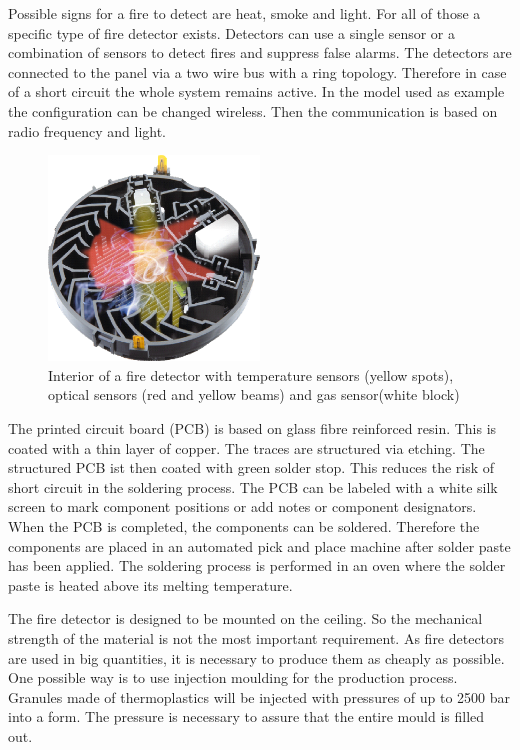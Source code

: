 Possible signs for a fire to detect are heat, smoke and light. For all of 
those a specific type of fire detector exists. Detectors can use a single 
sensor or a combination of sensors to detect fires and suppress false alarms. 
The detectors are connected to the panel via a two wire bus with a ring 
topology. Therefore in case of a short circuit the whole system remains 
active. In the model used as example the configuration can be changed wireless. 
Then the communication is based on radio frequency and light. 
\begin{figure}
\centering
\includegraphics[width=0.5\textwidth]{det_int.png}
\caption{Interior of a fire detector with temperature sensors (yellow spots), 
    optical sensors (red and yellow beams) and gas sensor(white block)}
\label{fig:det_int}
\end{figure}

The printed circuit board (PCB) is based on glass fibre reinforced resin. This 
is coated with a thin layer of copper. The traces are structured via etching. 
The structured PCB ist then coated with green solder stop. This reduces the 
risk of short circuit in the soldering process. The PCB can be labeled with a 
white silk screen to mark component positions or add notes or component 
designators. When the PCB is completed, the components can be soldered. 
Therefore the components are placed in an automated pick and place machine 
after solder paste has been applied. The soldering process is performed in 
an oven where the solder paste is heated above its melting temperature. 

The fire detector is designed to be mounted on the ceiling. So the mechanical 
strength of the material is not the most important requirement. As fire 
detectors are used in big quantities, it is necessary to produce them as 
cheaply as possible. One possible way is to use injection moulding for the 
production process. Granules made of thermoplastics will be injected with 
pressures of up to 2500 bar into a form. The pressure is necessary to assure 
that the entire mould is filled out.  
